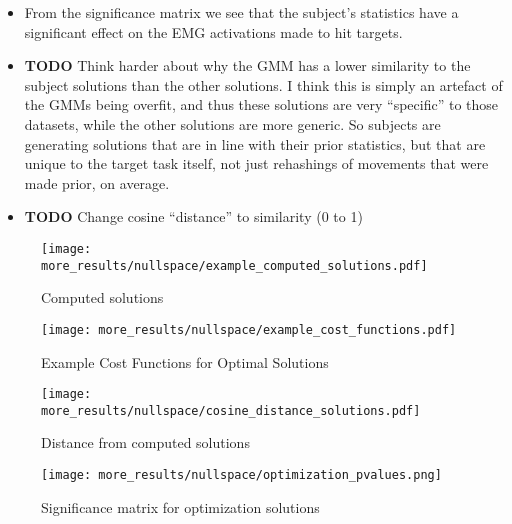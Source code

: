 \documentclass[../main.tex]{subfiles}
\begin{document}
\begin{itemize}
  \item From the significance matrix  we see that the subject's statistics have a significant effect on the EMG activations made to hit targets.
  \item \textbf{TODO} Think harder about why the GMM has a lower similarity to the subject solutions than the other solutions. I think this is simply an artefact of the GMMs being overfit, and thus these solutions are very ``specific'' to those datasets, while the other solutions are more generic. So subjects are generating solutions that are in line with their prior statistics, but that are unique to the target task itself, not just rehashings of movements that were made prior, on average.
  \item \textbf{TODO} Change cosine ``distance'' to similarity (0 to 1)
\end{itemize}


\begin{figure}[H]%
  \centering
    \texttt{[image: more\_results/nullspace/example\_computed\_solutions.pdf]}
    \caption[Computed solutions]{Computed solutions}\label{fig:computed_solutions}
\end{figure}

\begin{figure}[H]%
  \centering
    \texttt{[image: more\_results/nullspace/example\_cost\_functions.pdf]}
    \caption[Example Cost Functions for Optimal Solutions]{Example Cost Functions for Optimal Solutions}\label{fig:cost_functions}
\end{figure}

\begin{figure}[H]%
  \centering
    \texttt{[image: more\_results/nullspace/cosine\_distance\_solutions.pdf]}
    \caption[Distance from computed solutions]{Distance from computed solutions}\label{fig:computed_distances}
\end{figure}

\begin{figure}[H]%
  \centering
    \texttt{[image: more\_results/nullspace/optimization\_pvalues.png]}
    \caption[Significance matrix for optimization solutions]{Significance matrix for optimization solutions}\label{fig:optimization_pvalues}
\end{figure}
\end{document}
